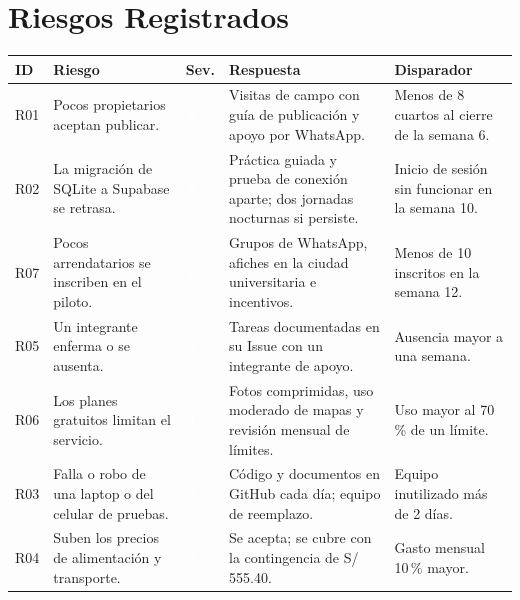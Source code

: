 \documentclass[11pt,a4paper]{article}
\newcommand{\etiqueta}[2]{{\setlength{\fboxsep}{2pt}\colorbox{#1}{\textcolor{white}{\scriptsize\bfseries #2}}}}
\begin{document}
\section{Riesgos Registrados}
{\small
{}
\noindent\begin{tabularx}{\textwidth}{@{}C{0.8cm} L C{0.9cm} L P{3.0cm}@{}}
\toprule
{}
\textbf{ID} & \textbf{Riesgo} & \textbf{Sev.} & \textbf{Respuesta} & \textbf{Disparador} \\
\midrule
R01 & Pocos propietarios aceptan publicar. & \etiqueta{SevAlta}{\,6\,} & Visitas de campo con guía de publicación y apoyo por WhatsApp. & Menos de 8 cuartos al cierre de la semana 6. \\
R02 & La migración de SQLite a Supabase se retrasa. & \etiqueta{SevAlta}{\,6\,} & Práctica guiada y prueba de conexión aparte; dos jornadas nocturnas si persiste. & Inicio de sesión sin funcionar en la semana 10. \\
R07 & Pocos arrendatarios se inscriben en el piloto. & \etiqueta{SevAlta}{\,6\,} & Grupos de WhatsApp, afiches en la ciudad universitaria e incentivos. & Menos de 10 inscritos en la semana 12. \\
R05 & Un integrante enferma o se ausenta. & \etiqueta{SevMedia}{\,4\,} & Tareas documentadas en su Issue con un integrante de apoyo. & Ausencia mayor a una semana. \\
R06 & Los planes gratuitos limitan el servicio. & \etiqueta{SevMedia}{\,4\,} & Fotos comprimidas, uso moderado de mapas y revisión mensual de límites. & Uso mayor al 70\,\% de un límite. \\
R03 & Falla o robo de una laptop o del celular de pruebas. & \etiqueta{SevMedia}{\,3\,} & Código y documentos en GitHub cada día; equipo de reemplazo. & Equipo inutilizado más de 2 días. \\
R04 & Suben los precios de alimentación y transporte. & \etiqueta{SevBaja}{\,2\,} & Se acepta; se cubre con la contingencia de S/ 555.40. & Gasto mensual 10\,\% mayor. \\
\bottomrule
\end{tabularx}
}

\end{document}
